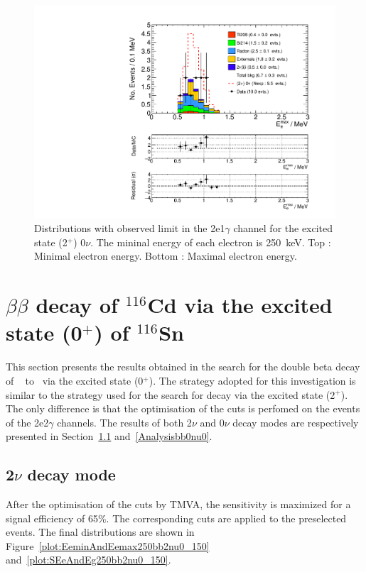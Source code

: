 \documentclass[main.tex]{subfiles}
\begin{document}
\begin{figure} [h!]
\begin{center}
\includegraphics[scale=0.36]{pictures/FinalResults/bb0nu2/150precut/Eemax_bb0nu2.pdf}
\end{center}
\caption{Distributions with observed limit in the 2e1$\gamma$ channel for the excited state (2$^+$) 0$\nu$. The mininal energy of each electron is 250~keV. Top : Minimal electron energy. Bottom : Maximal electron energy.}
\label{plot:SEeAndEg250bb0nu2Precut}
\end{figure}


\FloatBarrier


\section{$\beta\beta$ decay of $^{\text{116}}$Cd via the excited state (0$^+$) of $^{\text{116}}$Sn}\label{sec:Result0PLUS}


\NI This section presents the results obtained in the search for the double beta decay of \Cd ~ to \Sn ~via the excited state  (0$^+$). The strategy adopted for this investigation is similar to the strategy used for the search for decay via the excited state (2$^+$). The only difference is that the optimisation of the cuts is perfomed on the events of the 2e2$\gamma$ channels. The results of both 2$\nu$ and  0$\nu$ decay modes are respectively presented in Section~\ref{Analysisbb2nu0} and~\ref{Analysisbb0nu0}.


\subsection{2$\nu$ decay mode}\label{Analysisbb2nu0}


\NI After the optimisation of the cuts by TMVA, the sensitivity is maximized for a signal efficiency of 65\%. The corresponding cuts are applied to the preselected events. The final distributions are shown in Figure~\ref{plot:EeminAndEemax250bb2nu0_150} and~\ref{plot:SEeAndEg250bb2nu0_150}. 
\end{document}
